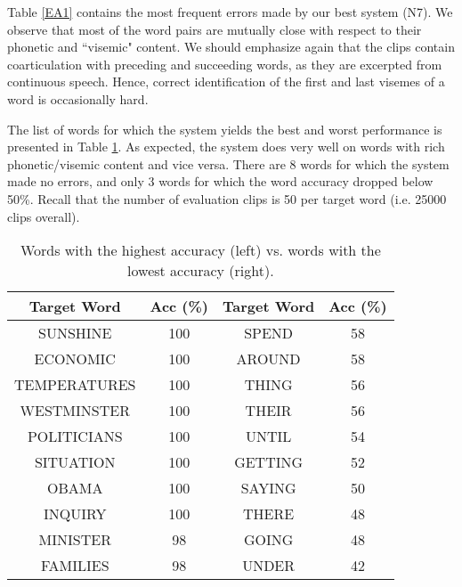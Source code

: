 \documentclass[a4paper]{article}
\begin{document}
Table \ref{EA1} contains the most frequent errors made by our best system (N7). We observe that most of the word pairs are mutually close with respect to their phonetic and ``visemic" content. We should emphasize again that the clips contain coarticulation with preceding and succeeding words, as they are excerpted from continuous speech. Hence, correct identification of the first and last visemes of a word is occasionally hard.

The list of words for which the system yields the best and worst performance is presented in Table \ref{EA2}. As expected, the system does very well on words with rich phonetic/visemic content and vice versa. There are 8 words for which the system made no errors, and only 3 words for which the word accuracy dropped below 50\%. Recall that the number of evaluation clips is 50 per target word (i.e. 25000 clips overall). 

\begin{table}[!htbp]
\centering
\begin{tabular}{| c | c || c | c |}
\hline
Target Word & Acc (\%) & Target Word & Acc (\%) \\ 
\hline\hline
SUNSHINE & 100 & SPEND & 58 \\	
\hline
ECONOMIC & 100 & AROUND & 58 \\	
\hline
TEMPERATURES & 100 & THING & 56 \\
\hline
WESTMINSTER & 100 & THEIR & 56 \\	
\hline
POLITICIANS & 100 & UNTIL & 54 \\	
\hline
SITUATION & 100 & GETTING & 52 \\	
\hline
OBAMA & 100 & SAYING & 50 \\	
\hline
INQUIRY & 100 & THERE & 48 \\	
\hline
MINISTER & 98 & GOING & 48	\\
\hline
FAMILIES & 98 & UNDER & 42	\\
\hline
\end{tabular}
\vspace{1mm}\caption{Words with the highest accuracy (left) vs. words with the lowest accuracy (right).}\label{EA2}
\end{table}
\vspace{-2mm}
\end{document}
